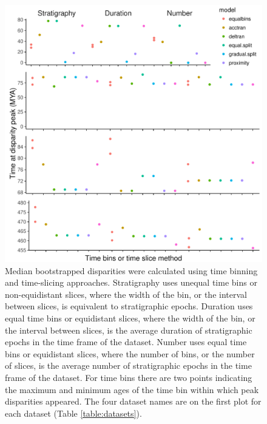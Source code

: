 \documentclass[12pt,a4paper]{article}
\begin{document}
   
  \label{table:wilcox2}  

\begin{figure}[!htbp]
    \centering
    \includegraphics[width=1\linewidth, height=1\textheight, keepaspectratio]{figures/fig-peaks-epoch-appendix.pdf}
    \caption[Timing of peak disparity for four example datasets.]
    {Median bootstrapped disparities were calculated using time binning and time-slicing approaches. 
    Stratigraphy uses unequal time bins or non-equidistant slices, where the width of the bin, or the interval between slices, is equivalent to stratigraphic epochs. 
    Duration uses equal time bins or equidistant slices, where the width of the bin, or the interval between slices, is the average duration of stratigraphic epochs in the time frame of the dataset. 
    Number uses equal time bins or equidistant slices, where the number of bins, or the number of slices, is the average number of stratigraphic epochs in the time frame of the dataset. 
    For time bins there are two points indicating the maximum and minimum ages of the time bin within which peak disparities appeared.
    The four dataset names are on the first plot for each dataset (Table \ref{table:datasets}).}
    \label{figure:peak2}
  \end{figure}
\end{document}
